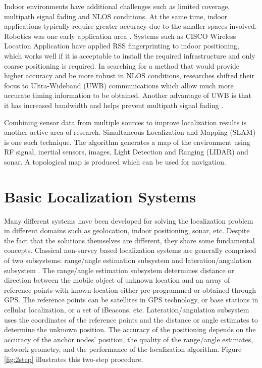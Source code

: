 Indoor environments have additional challenges such as limited coverage, multipath signal fading and NLOS conditions. At the same time, indoor applications typically require greater accuracy due to the smaller spaces involved. Robotics was one early application area \cite{Durant}. Systems such as CISCO Wireless Location Application \cite{CiscoWLA} have applied RSS fingerprinting to indoor positioning, which works well if it is acceptable to install the required infrastructure and only coarse positioning is required. In searching for a method that would provide higher accuracy and be more robust in NLOS conditions, researches shifted their focus to Ultra-Wideband (UWB) communications which allow much more accurate timing information to be obtained. Another advantage of UWB is that it has increased bandwidth and helps prevent multipath signal fading \cite{AlaviUWB}.

Combining sensor data from multiple sources to improve localization results is another active area of research. Simultaneous Localization and Mapping (SLAM) is one such technique. The algorithm generates a map of the environment using RF signal, inertial sensors, images, Light Detection and Ranging (LIDAR) and sonar. A topological map is produced which can be used for navigation.



\section{Basic Localization Systems}

Many different systems have been developed for solving the localization problem in different domains such as geolocation, indoor positioning, sonar, etc. Despite the fact that the  solutions themselves are different, they share some fundamental concepts. Classical non-survey based localization systems  are generally comprised of two subsystems: range/angle estimation subsystem and lateration/angulation subsystem \cite{GeoLoc}. The range/angle estimation subsystem determines distance or direction between the  mobile object of unknown location  and an array of reference points with known location  either pre-programmed or obtained through GPS.  The reference points can be satellites in GPS technology, or base stations in cellular localization, or a set of iBeacons, etc. Lateration/angulation subsystem uses the coordinates of the reference points and the distance or angle estimates to determine the unknown position.  The accuracy of the positioning depends on the accuracy of the anchor nodes’ position, the quality of the range/angle estimates, network geometry, and the performance of the localization algorithm. Figure \ref{fig:2step} illustrates this two-step procedure.



